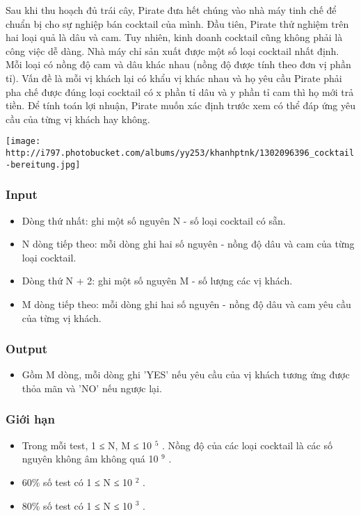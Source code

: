



   Sau khi thu hoạch đủ trái cây, Pirate đưa hết chúng vào nhà máy tinh chế để chuẩn bị cho sự nghiệp bán cocktail của mình. Đầu tiên, Pirate thử nghiệm trên hai loại quả là dâu và cam. Tuy nhiên, kinh doanh cocktail cũng không phải là công việc dễ dàng. Nhà máy chỉ sản xuất được một số loại cocktail nhất định. Mỗi loại có nồng độ cam và dâu khác nhau (nồng độ được tính theo đơn vị phần tỉ). Vấn đề là mỗi vị khách lại có khẩu vị khác nhau và họ yêu cầu Pirate phải pha chế được đúng loại cocktail có x phần tỉ dâu và y phần tỉ cam thì họ mới trả tiền. Để tính toán lợi nhuận, Pirate muốn xác định trước xem có thể đáp ứng yêu cầu của từng vị khách hay không.  


\texttt{[image: http://i797.photobucket.com/albums/yy253/khanhptnk/1302096396\_cocktail-bereitung.jpg]}

\subsubsection{   Input  }
\begin{itemize}
	\item     Dòng thứ nhất: ghi một số nguyên N - số loại cocktail có sẵn.   
	\item     N dòng tiếp theo: mỗi dòng ghi hai số nguyên - nồng độ dâu và cam của từng loại cocktail.   
	\item     Dòng thứ N + 2: ghi một số nguyên M - số lượng các vị khách.   
	\item     M dòng tiếp theo: mỗi dòng ghi hai số nguyên - nồng độ dâu và cam yêu cầu của từng vị khách.   
\end{itemize}

\subsubsection{   Output  }
\begin{itemize}
	\item     Gồm M dòng, mỗi dòng ghi 'YES' nếu yêu cầu của vị khách tương ứng được thỏa mãn và 'NO' nếu ngược lại.   
\end{itemize}

\subsubsection{   Giới hạn  }
\begin{itemize}
	\item     Trong mỗi test, 1 ≤ N, M ≤ 10    $^     5    $    . Nồng độ của các loại cocktail là các số nguyên không âm không quá 10    $^     9    $    .   
	\item     60\% số test có 1 ≤ N ≤ 10    $^     2    $    .   
	\item     80\% số test có 1 ≤ N ≤ 10    $^     3    $    .   
\end{itemize}

